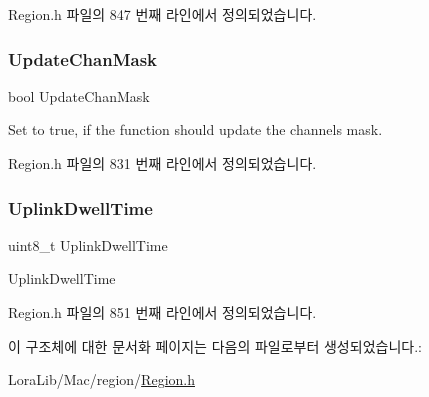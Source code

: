Region.\+h 파일의 847 번째 라인에서 정의되었습니다.

\mbox{\label{structs_adr_next_params_a708080da9c63d868556b2c48cb53003b}} 
\subsubsection{\texorpdfstring{Update\+Chan\+Mask}{UpdateChanMask}}
{\footnotesize\ttfamily bool Update\+Chan\+Mask}

Set to true, if the function should update the channels mask. 

Region.\+h 파일의 831 번째 라인에서 정의되었습니다.

\mbox{\label{structs_adr_next_params_a0e6663762d6f9173bc8d8cb018f8f17a}} 
\subsubsection{\texorpdfstring{Uplink\+Dwell\+Time}{UplinkDwellTime}}
{\footnotesize\ttfamily uint8\+\_\+t Uplink\+Dwell\+Time}

Uplink\+Dwell\+Time 

Region.\+h 파일의 851 번째 라인에서 정의되었습니다.



이 구조체에 대한 문서화 페이지는 다음의 파일로부터 생성되었습니다.\+:\begin{DoxyCompactItemize}
\item 
Lora\+Lib/\+Mac/region/\mbox{\hyperlink{_region_8h}{Region.\+h}}\end{DoxyCompactItemize}
